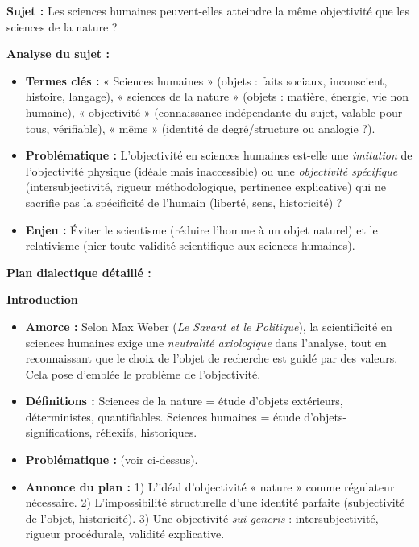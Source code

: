 \documentclass[11pt]{article}
\begin{document}
\begin{exoresolu}
\textbf{Sujet :} \guillemotleft Les sciences humaines peuvent-elles atteindre la même objectivité que les sciences de la nature ? \guillemotright

\textbf{Analyse du sujet :}
\begin{itemize}
    \item \textbf{Termes clés :} « Sciences humaines » (objets : faits sociaux, inconscient, histoire, langage), « sciences de la nature » (objets : matière, énergie, vie non humaine), « objectivité » (connaissance indépendante du sujet, valable pour tous, vérifiable), « même » (identité de degré/structure ou analogie ?).
    \item \textbf{Problématique :} L'objectivité en sciences humaines est-elle une \emph{imitation} de l'objectivité physique (idéale mais inaccessible) ou une \emph{objectivité spécifique} (intersubjectivité, rigueur méthodologique, pertinence explicative) qui ne sacrifie pas la spécificité de l'humain (liberté, sens, historicité) ?
    \item \textbf{Enjeu :} Éviter le scientisme (réduire l'homme à un objet naturel) et le relativisme (nier toute validité scientifique aux sciences humaines).
\end{itemize}

\textbf{Plan dialectique détaillé :}

\textbf{Introduction}
\begin{itemize}
    \item \textbf{Amorce :} Selon Max Weber (\emph{Le Savant et le Politique}), la scientificité en sciences humaines exige une \emph{neutralité axiologique} dans l'analyse, tout en reconnaissant que le choix de l'objet de recherche est guidé par des valeurs. Cela pose d'emblée le problème de l'objectivité.
    \item \textbf{Définitions :} Sciences de la nature = étude d'objets extérieurs, déterministes, quantifiables. Sciences humaines = étude d'objets-significations, réflexifs, historiques.
    \item \textbf{Problématique :} (voir ci-dessus).
    \item \textbf{Annonce du plan :} 1) L'idéal d'objectivité « nature » comme régulateur nécessaire. 2) L'impossibilité structurelle d'une identité parfaite (subjectivité de l'objet, historicité). 3) Une objectivité \emph{sui generis} : intersubjectivité, rigueur procédurale, validité explicative.
\end{itemize}


\end{exoresolu}
\end{document}
